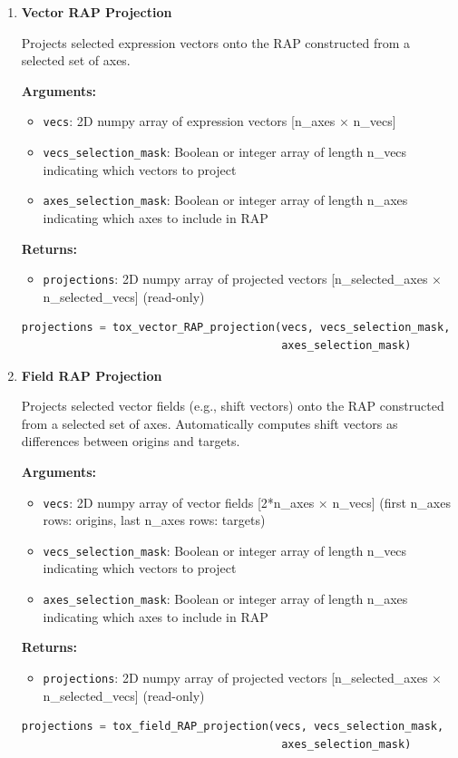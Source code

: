 \begin{enumerate}
    \item \textbf{Vector RAP Projection}

    Projects selected expression vectors onto the RAP constructed from a selected set of axes.
    
    \textbf{Arguments:}
    \begin{itemize}
        \item \texttt{vecs}: 2D numpy array of expression vectors [n\_axes × n\_vecs]
        \item \texttt{vecs\_selection\_mask}: Boolean or integer array of length n\_vecs indicating which vectors to project
        \item \texttt{axes\_selection\_mask}: Boolean or integer array of length n\_axes indicating which axes to include in RAP
    \end{itemize}
    \textbf{Returns:}
    \begin{itemize}
        \item \texttt{projections}: 2D numpy array of projected vectors [n\_selected\_axes × n\_selected\_vecs] (read-only)
    \end{itemize}
\begin{lstlisting}[language=Python, caption={Vector RAP Projection}]
projections = tox_vector_RAP_projection(vecs, vecs_selection_mask, 
                                        axes_selection_mask)
\end{lstlisting}

    \item \textbf{Field RAP Projection}

    Projects selected vector fields (e.g., shift vectors) onto the RAP constructed from a selected set of axes. Automatically computes shift vectors as differences between origins and targets.
    
    \textbf{Arguments:}
    \begin{itemize}
        \item \texttt{vecs}: 2D numpy array of vector fields [2*n\_axes × n\_vecs] (first n\_axes rows: origins, last n\_axes rows: targets)
        \item \texttt{vecs\_selection\_mask}: Boolean or integer array of length n\_vecs indicating which vectors to project
        \item \texttt{axes\_selection\_mask}: Boolean or integer array of length n\_axes indicating which axes to include in RAP
    \end{itemize}
    \textbf{Returns:}
    \begin{itemize}
        \item \texttt{projections}: 2D numpy array of projected vectors [n\_selected\_axes × n\_selected\_vecs] (read-only)
    \end{itemize}
\begin{lstlisting}[language=Python, caption={Vector Field RAP Projection}]
projections = tox_field_RAP_projection(vecs, vecs_selection_mask, 
                                        axes_selection_mask)
\end{lstlisting}


\end{enumerate}
